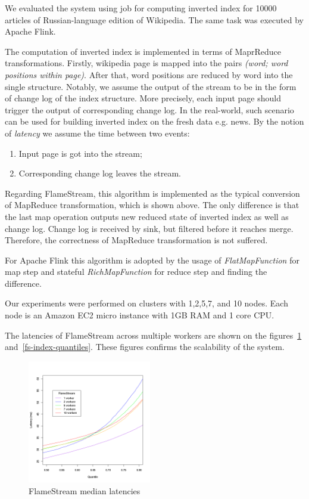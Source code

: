 
\label {fs-experiments-section}

We evaluated the system using job for computing inverted index for 10000 articles of Russian-language edition of Wikipedia. The same task was executed by Apache Flink.

The computation of inverted index is implemented in terms of MaprReduce transformations. Firstly, wikipedia page is mapped into the pairs {\it (word; word positions within page)}. After that, word positions are reduced by word into the single structure. Notably, we assume the output of the stream to be in the form of change log of the index structure. More precisely, each input page should trigger the output of corresponding change log. In the real-world, such scenario can be used for building inverted index on the fresh data e.g. news. By the notion of {\it latency} we assume the time between two events: 
\begin{enumerate}
    \item Input page is got into the stream;
    \item Corresponding change log leaves the stream.
\end{enumerate}

Regarding FlameStream, this algorithm is implemented as the typical conversion of MapReduce transformation, which is shown above. The only difference is that the last map operation outputs new reduced state of inverted index as well as change log. Change log is received by sink, but filtered before it reaches merge. Therefore, the correctness of MapReduce transformation is not suffered.

For Apache Flink this algorithm is adopted by the usage of {\it FlatMapFunction} for map step and stateful {\it RichMapFunction} for reduce step and finding the difference.

Our experiments were performed on clusters with 1,2,5,7, and 10 nodes. Each node is an Amazon EC2 micro instance with 1GB RAM and 1 core CPU.

The latencies of FlameStream across multiple workers are shown on the figures~\ref{fs-index-median} and~\ref{fs-index-quantiles}. These figures confirms the scalability of the system.

\begin{figure}[htbp]
  \centering
  \includegraphics[width=0.48\textwidth]{pics/fs-index-median}
  \caption{FlameStream median latencies}
  \label {fs-index-median}
\end{figure}

